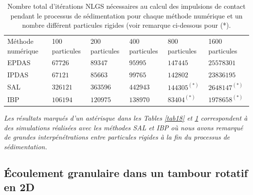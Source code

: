 \begin{table}[!h]
\begin{tabular}{|p{2cm}|p{1.75cm}|p{1.75cm}|p{1.75cm}|p{1.9cm}|p{1.9cm}|}
  \hline \rowcolor{lightgray}
  \multicolumn{6}{|c|}{Nombre total d'iterations NLGS} \\
  \hline \rowcolor{lightgray}
  Méthode numérique& 100 particules & 200 particules & 400 particules & 800 particules & 1600 particules \\ 
  \hline  EPDAS & $67726$ & $89347$ & $95995$ & $147445$ & $25578301$\\
  IPDAS & $67121$ & $85663$ & $99765$ & $142802$ & $23836195$\\
  SAL & $326121$ & $363596$ & $442943$ & $144305^{(*)}$ & $2648147^{(*)}$\\
  IBP & $106194$ & $120975$ & $138970$ & $83404^{(*)}$ & $1978658^{(*)}$\\ 
 \hline
\end{tabular}
 \caption{Nombre total d'itérations NLGS nécessaires au calcul des impulsions de contact pendant le processus de sédimentation pour chaque méthode numérique et un nombre différent particules rigides (voir remarque ci-dessous pour (*).}\label{tab19}
\end{table}

\noindent \begin{remarque1}
\textit{Les résultats marqués d'un astérisque dans les Tables \ref{tab18} et \ref{tab19} correspondent à des simulations réalisées avec les méthodes SAL et IBP où nous avons remarqué de grandes interpénétrations entre particules rigides à la fin du processus de sédimentation.}
\end{remarque1}




\subsection{Écoulement granulaire dans un tambour rotatif en 2D}\label{ex4}

